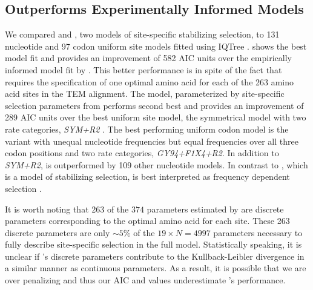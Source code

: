 \documentclass[fleqn,letterpaper]{article}
\begin{document}
\subsection{\selac Outperforms Experimentally Informed Models}
We compared \selac and \phydms, two models of site-specific stabilizing selection, to 131 nucleotide and 97 codon uniform site models fitted using IQTree \citep[][see Table \ref{tab:AIC_selac} for the best performing models and Table \ref{tab:AIC_full} for all models]{nguyen2015}.
\selac shows the best model fit and provides an improvement of 582 AIC units over the empirically informed model fit by \phydms.
This better performance is in spite of the fact that \selac requires the specification of one optimal amino acid for each of the 263 amino acid sites in the TEM alignment.
The \phydms model, parameterized by site-specific selection parameters from \citet{stiffler2016} performs second best and provides an improvement of 289 AIC units over the best uniform site model, the symmetrical model with two rate categories, \emph{SYM+R2} \citet{zharkikh1994}. 
The best performing uniform codon model is the \gy variant with unequal nucleotide frequencies but equal frequencies over all three codon positions and two rate categories, \emph{GY94+F1X4+R2}. 
In addition to \emph{SYM+R2}, \gy is outperformed by 109 other nucleotide models.
In contrast to \selac, which is a model of stabilizing selection, \gy is best interpreted as frequency dependent selection \citep{HughesAndNei1988,Nowak2006,Hughes2007,beaulieu2019}.

It is worth noting that 263 of the $374$ parameters estimated by \selac are discrete parameters corresponding to the optimal amino acid for each site.
These 263 discrete parameters are only $\sim5\%$ of the $19\times N = 4997$ parameters necessary to fully describe site-specific selection in the full \hb model.
Statistically speaking, it is unclear if \selac's discrete parameters contribute to the Kullback-Leibler divergence in a similar manner as continuous parameters.
As a result, it is possible that we are over penalizing \selac and thus our AIC and \DeltaAIC values underestimate \selac's performance.
\end{document}
